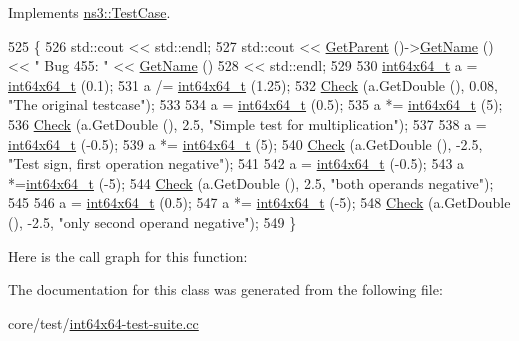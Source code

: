 Implements \hyperlink{classns3_1_1TestCase_a8ff74680cf017ed42011e4be51917a24}{ns3\+::\+Test\+Case}.


\begin{DoxyCode}
525 \{
526   std::cout << std::endl;
527   std::cout << \hyperlink{classns3_1_1TestCase_af41db0462b844c9f81838d0e61ecd563}{GetParent} ()->\hyperlink{classns3_1_1TestCase_a28f7bb59669c24dae1c290fc17fc9b62}{GetName} () << \textcolor{stringliteral}{" Bug 455: "} << 
      \hyperlink{classns3_1_1TestCase_a28f7bb59669c24dae1c290fc17fc9b62}{GetName} ()
528             << std::endl;
529   
530   \hyperlink{classint64x64__t}{int64x64\_t} a = \hyperlink{classint64x64__t}{int64x64\_t} (0.1);
531   a /= \hyperlink{classint64x64__t}{int64x64\_t} (1.25);
532   \hyperlink{classns3_1_1int64x64_1_1test_1_1Int64x64Bug455TestCase_a2f804771e031d459c8bd61645b347b13}{Check} (a.GetDouble (), 0.08, \textcolor{stringliteral}{"The original testcase"});
533   
534   a = \hyperlink{classint64x64__t}{int64x64\_t} (0.5);
535   a *= \hyperlink{classint64x64__t}{int64x64\_t} (5);
536   \hyperlink{classns3_1_1int64x64_1_1test_1_1Int64x64Bug455TestCase_a2f804771e031d459c8bd61645b347b13}{Check} (a.GetDouble (), 2.5, \textcolor{stringliteral}{"Simple test for multiplication"});
537   
538   a = \hyperlink{classint64x64__t}{int64x64\_t} (-0.5);
539   a *= \hyperlink{classint64x64__t}{int64x64\_t} (5);
540   \hyperlink{classns3_1_1int64x64_1_1test_1_1Int64x64Bug455TestCase_a2f804771e031d459c8bd61645b347b13}{Check} (a.GetDouble (), -2.5, \textcolor{stringliteral}{"Test sign, first operation negative"});
541   
542   a = \hyperlink{classint64x64__t}{int64x64\_t} (-0.5);
543   a *=\hyperlink{classint64x64__t}{int64x64\_t} (-5);
544   \hyperlink{classns3_1_1int64x64_1_1test_1_1Int64x64Bug455TestCase_a2f804771e031d459c8bd61645b347b13}{Check} (a.GetDouble (), 2.5, \textcolor{stringliteral}{"both operands negative"});
545   
546   a = \hyperlink{classint64x64__t}{int64x64\_t} (0.5);
547   a *= \hyperlink{classint64x64__t}{int64x64\_t} (-5);
548   \hyperlink{classns3_1_1int64x64_1_1test_1_1Int64x64Bug455TestCase_a2f804771e031d459c8bd61645b347b13}{Check} (a.GetDouble (), -2.5, \textcolor{stringliteral}{"only second operand negative"});
549 \}
\end{DoxyCode}


Here is the call graph for this function\+:




The documentation for this class was generated from the following file\+:\begin{DoxyCompactItemize}
\item 
core/test/\hyperlink{int64x64-test-suite_8cc}{int64x64-\/test-\/suite.\+cc}\end{DoxyCompactItemize}
